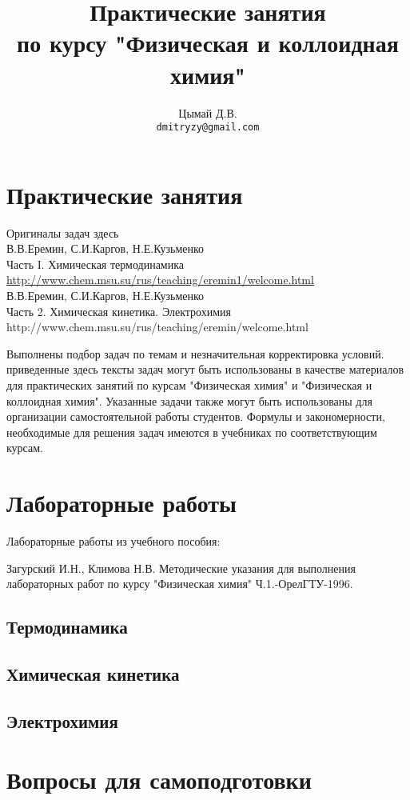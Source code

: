 \documentclass[12pt,a4paper]{report}
\author{Цымай Д.В.\\ \texttt{dmitryzy@gmail.com}}
\title{Практические занятия \\ по курсу "Физическая и коллоидная химия"}
\date{}
\begin{document}

\newpage
\part{Практические занятия}
Оригиналы задач здесь \\
В.В.Еремин, С.И.Каргов, Н.Е.Кузьменко \\
Часть I. Химическая термодинамика\\
\url{ http://www.chem.msu.su/rus/teaching/eremin1/welcome.html}\\
В.В.Еремин, С.И.Каргов, Н.Е.Кузьменко \\
Часть 2. Химическая кинетика. Электрохимия\\
http://www.chem.msu.su/rus/teaching/eremin/welcome.html

Выполнены подбор задач по темам и незначительная корректировка условий. приведенные здесь тексты задач могут быть использованы в качестве материалов для практических занятий по курсам "Физическая химия" и "Физическая и коллоидная химия". Указанные задачи также могут быть использованы для организации самостоятельной работы студентов. Формулы и закономерности, необходимые для решения задач имеются в учебниках по соответствующим курсам. 


\newpage

\newpage

\newpage

\newpage

\newpage

\part{Лабораторные работы}
Лабораторные работы из учебного пособия: 

Загурский И.Н., Климова Н.В. Методические указания для выполнения лабораторных работ по курсу "Физическая химия" Ч.1.-ОрелГТУ-1996.
\chapter{Термодинамика}
\newpage

\newpage

\newpage

\chapter{Химическая кинетика}
\newpage

\chapter{Электрохимия}
\newpage

\newpage

\part{Вопросы для самоподготовки}
\end{document}
